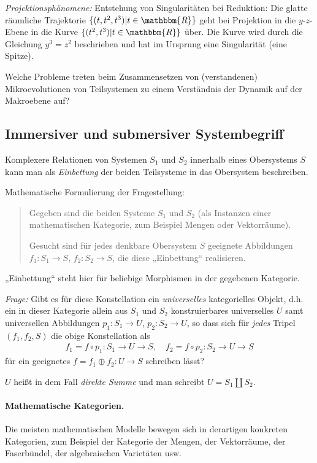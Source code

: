 \documentclass[11pt,a4paper]{article}
\begin{document}
\emph{Projektionsphänomene:} Entstehung von Singularitäten bei Reduktion: Die
glatte räumliche Trajektorie $\{(t,t^2,t^3)|t\in\mathbbm{R}\}$ geht bei
Projektion in die $y$-$z$-Ebene in die Kurve $\{(t^2,t^3)|t\in\mathbbm{R}\}$
über. Die Kurve wird durch die Gleichung $y^3=z^2$ beschrieben und hat im
Ursprung eine Singularität (eine Spitze).

Welche Probleme treten beim Zusammensetzen von (verstandenen) Mikroevolutionen
von Teilsystemen zu einem Verständnis der Dynamik auf der Makroebene auf?

\subsection{Immersiver und submersiver Systembegriff}

Komplexere Relationen von Systemen $S_1$ und $S_2$ innerhalb eines Obersystems
$S$ kann man als \emph{Einbettung} der beiden Teilsysteme in das Obersystem
beschreiben.

Mathematische Formulierung der Fragestellung: 
\begin{quote}
  Gegeben sind die beiden Systeme $S_1$ und $S_2$ (als Instanzen einer
  mathematischen Kategorie, zum Beispiel Mengen oder Vektorräume).
  
  Gesucht sind für jedes denkbare Obersystem $S$ geeignete Abbildungen $f_1:
  S_1 \rightarrow S$, $f_2: S_2 \rightarrow S$, die diese „Einbettung“
  realisieren.
\end{quote}
„Einbettung“ steht hier für beliebige Morphismen in der gegebenen Kategorie. 

\emph{Frage:} Gibt es für diese Konstellation ein \emph{universelles}
kategorielles Objekt, d.h. ein in dieser Kategorie allein aus $S_1$ und $S_2$
konstruierbares universelles $U$ samt universellen Abbildungen $p_1: S_1
\rightarrow U$, $p_2: S_2 \rightarrow U$, so dass sich für \emph{jedes} Tripel
$(f_1, f_2, S)$ die obige Konstellation als
\begin{gather*}
  f_1 = f \circ p_1: S_1 \rightarrow U \rightarrow S,\quad f_2 = f \circ p_2:
  S_2 \rightarrow U \rightarrow S
\end{gather*}
für ein geeignetes $f = f_1\oplus f_2: U \rightarrow  S$ schreiben lässt?

$U$ heißt in dem Fall \emph{direkte Summe} und man schreibt $U = S_1\coprod
S_2$.

\paragraph{Mathematische Kategorien.}
Die meisten mathematischen Modelle bewegen sich in derartigen konkreten
Kategorien, zum Beispiel der Kategorie der Mengen, der Vektorräume, der
Faserbündel, der algebraischen Varietäten usw.
\end{document}
